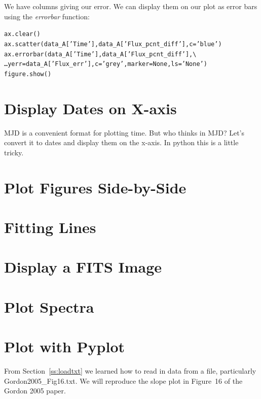 We have columns giving our error. We can display them on our plot as
error bars using the \textit{errorbar} function:

\begin{alltt}
\pytab ax.clear()
\pytab ax.scatter(data_A['Time'], data_A['Flux_pcnt_diff'], c='blue')
\pytab ax.errorbar(data_A['Time'], data_A['Flux_pcnt_diff'], \textbackslash 
\ldots yerr=data_A['Flux_err'], c='grey', marker=None, ls='None')
\pytab figure.show()
\end{alltt}


\section{Display Dates on X-axis}

MJD is a convenient format for plotting time. But who 
thinks in MJD? Let's convert it to dates and display them 
on the x-axis. In python this is a little tricky.



\section{Plot Figures Side-by-Side}



\section{Fitting Lines}



\section{Display a FITS Image}


\section{Plot Spectra}








\section{Plot with Pyplot}
From Section~\ref{ss:loadtxt} we learned how to read in data from a
file, particularly Gordon2005\_Fig16.txt.  We will reproduce the slope
plot in Figure~16 of the Gordon 2005 paper.

